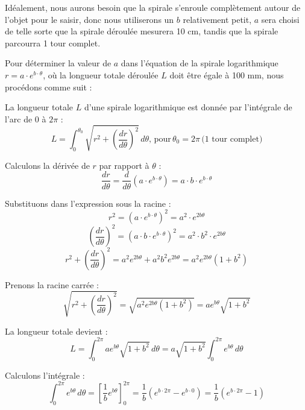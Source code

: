 \documentclass[a4paper, 11pt]{report}
\begin{document}
            Idéalement, nous aurons besoin que la spirale s'enroule complètement autour de l'objet pour le saisir, donc nous utiliserons un $b$ relativement petit, $a$ sera choisi de telle sorte que la spirale déroulée mesurera 10 cm, tandis que la spirale parcourra 1 tour complet.
        
            Pour déterminer la valeur de \( a \) dans l'équation de la spirale logarithmique \( r = a \cdot e^{b \cdot \theta} \), où la longueur totale déroulée \( L \) doit être égale à 100 mm, nous procédons comme suit :

            La longueur totale \( L \) d'une spirale logarithmique est donnée par l'intégrale de l'arc de $0$ à $2\pi$ :
            \[
            L = \int_0^{\theta_0} \sqrt{r^2 + \left(\frac{dr}{d\theta}\right)^2} \, d\theta, \, \text{pour} \, \theta_0 = 2\pi \, \text{(1 tour complet)}
            \]
            
            Calculons la dérivée de \( r \) par rapport à \( \theta \) :
            \[
            \frac{dr}{d\theta} = \frac{d}{d\theta} \left( a \cdot e^{b \cdot \theta} \right) = a \cdot b \cdot e^{b \cdot \theta}
            \]
            
            Substituons dans l'expression sous la racine :
            \[
            r^2 = \left( a \cdot e^{b \cdot \theta} \right)^2 = a^2 \cdot e^{2b \theta}
            \]
            \[
            \left( \frac{dr}{d\theta} \right)^2 = \left( a \cdot b \cdot e^{b \cdot \theta} \right)^2 = a^2 \cdot b^2 \cdot e^{2b \theta}
            \]
            \[
            r^2 + \left( \frac{dr}{d\theta} \right)^2 = a^2 e^{2b \theta} + a^2 b^2 e^{2b \theta} = a^2 e^{2b \theta} (1 + b^2)
            \]
            
            Prenons la racine carrée :
            \[
            \sqrt{r^2 + \left( \frac{dr}{d\theta} \right)^2} = \sqrt{a^2 e^{2b \theta} (1 + b^2)} = a e^{b \theta} \sqrt{1 + b^2}
            \]
            
            La longueur totale devient :
            \[
            L = \int_0^{2\pi} a e^{b \theta} \sqrt{1 + b^2} \, d\theta = a \sqrt{1 + b^2} \int_0^{2\pi} e^{b \theta} \, d\theta
            \]
            
            Calculons l'intégrale :
            \[
            \int_0^{2\pi} e^{b \theta} \, d\theta = \left[ \frac{1}{b} e^{b \theta} \right]_0^{2\pi} = \frac{1}{b} \left( e^{b \cdot 2\pi} - e^{b \cdot 0} \right) = \frac{1}{b} \left( e^{b \cdot 2\pi} - 1 \right)
            \]
            
\end{document}
